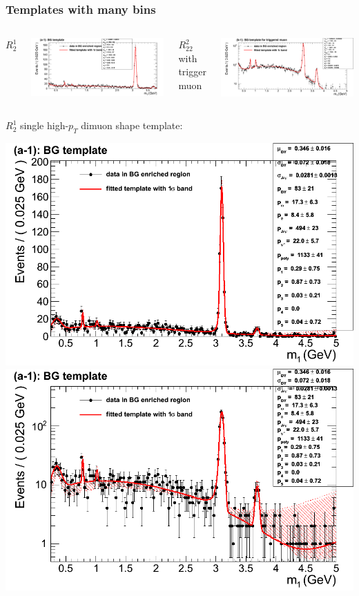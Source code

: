 \documentclass[compress]{beamer}
\begin{document}
\begin{frame}
\frametitle{Templates with many bins}

\begin{columns}
\centering $R^1_2$

\includegraphics[width=\linewidth]{manybins_a1.png}

\centering $R^2_{22}$ with trigger muon

\includegraphics[width=\linewidth]{manybins_b1t.png}
\end{columns}

\vspace{0.5 cm}
$R^1_2$ single high-$p_T$ dimuon shape template:

\vspace{0.2 cm}
\includegraphics[width=0.5\linewidth]{template__bkg_model_a1__m_1.png}
\includegraphics[width=0.5\linewidth]{template__bkg_model_a1__m_1_log.png}
\end{frame}
\end{document}
